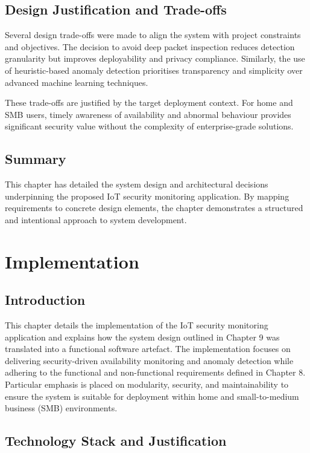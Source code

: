 \section{Design Justification and Trade-offs}

Several design trade-offs were made to align the system with project constraints and objectives. The decision to avoid deep packet inspection reduces detection granularity but improves deployability and privacy compliance. Similarly, the use of heuristic-based anomaly detection prioritises transparency and simplicity over advanced machine learning techniques.

These trade-offs are justified by the target deployment context. For home and SMB users, timely awareness of availability and abnormal behaviour provides significant security value without the complexity of enterprise-grade solutions.

\section{Summary}

This chapter has detailed the system design and architectural decisions underpinning the proposed IoT security monitoring application. By mapping requirements to concrete design elements, the chapter demonstrates a structured and intentional approach to system development.

\chapter{Implementation}

\section{Introduction}

This chapter details the implementation of the IoT security monitoring application and explains how the system design outlined in Chapter 9 was translated into a functional software artefact. The implementation focuses on delivering security-driven availability monitoring and anomaly detection while adhering to the functional and non-functional requirements defined in Chapter 8. Particular emphasis is placed on modularity, security, and maintainability to ensure the system is suitable for deployment within home and small-to-medium business (SMB) environments.

\section{Technology Stack and Justification}

